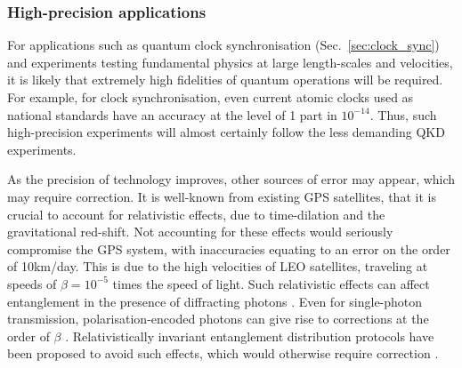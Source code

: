 %
%

\subsubsection{High-precision applications}

For applications such as quantum clock synchronisation (Sec.~\ref{sec:clock_sync}) and experiments testing fundamental physics at large length-scales and velocities, it is likely that extremely high fidelities of quantum operations will be required. For example, for clock synchronisation, even current atomic clocks used as national standards have an accuracy at the level of 1 part in $10^{-14}$. Thus, such high-precision experiments will almost certainly follow the less demanding QKD experiments.

As the precision of technology improves, other sources of error may appear, which may require correction. It is well-known from existing GPS satellites, that it is crucial to account for relativistic effects, due to time-dilation and the gravitational red-shift. Not accounting for these effects would seriously compromise the GPS system, with inaccuracies equating to an error on the order of 10km/day. This is due to the high velocities of LEO satellites, traveling at speeds of $\beta = 10^{-5}$ times the speed of light. Such relativistic effects can affect entanglement in the presence of diffracting photons \cite{bib:gingrich03}. Even for single-photon transmission, polarisation-encoded photons can give rise to corrections at the order of $\beta$ \cite{bib:byrnes2017lorentz} . Relativistically invariant entanglement distribution protocols have been proposed to avoid such effects, which would otherwise require correction \cite{bib:yurtsever02, bib:li2003relativistic, bib:byrnes2017lorentz}.